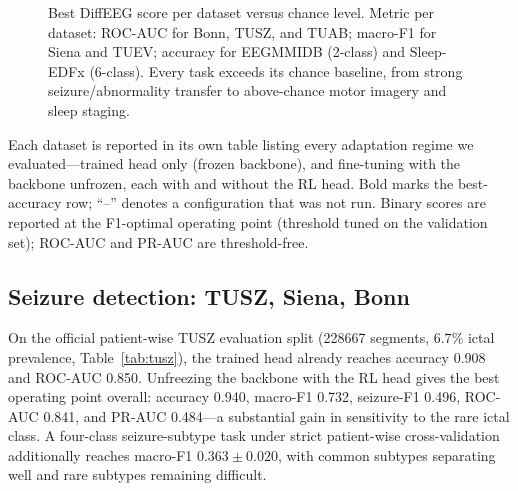\documentclass[journal]{IEEEtran}
\begin{document}
\begin{figure}[t]
\centering
{}
\caption{Best DiffEEG score per dataset versus chance level. Metric per dataset:
ROC-AUC for Bonn, TUSZ, and TUAB; macro-F1 for Siena and TUEV; accuracy for
EEGMMIDB (2-class) and Sleep-EDFx (6-class). Every task exceeds its chance
baseline, from strong seizure/abnormality transfer to above-chance motor imagery
and sleep staging.}
\label{fig:transfer}
\end{figure}

Each dataset is reported in its own table listing every adaptation regime we
evaluated---trained head only (frozen backbone), and fine-tuning with the
backbone unfrozen, each with and without the RL head. Bold marks the
best-accuracy row; ``--'' denotes a configuration that was not run. Binary
scores are reported at the F1-optimal operating point (threshold tuned on the
validation set); ROC-AUC and PR-AUC are threshold-free.

\subsection{Seizure detection: TUSZ, Siena, Bonn}
On the official patient-wise TUSZ evaluation split (\num{228667} segments,
$6.7\%$ ictal prevalence, Table~\ref{tab:tusz}), the trained head already
reaches accuracy \num{0.908} and ROC-AUC \num{0.850}. Unfreezing the backbone
with the RL head gives the best operating point overall: accuracy \num{0.940},
macro-F1 \num{0.732}, seizure-F1 \num{0.496}, ROC-AUC \num{0.841}, and PR-AUC
\num{0.484}---a substantial gain in sensitivity to the rare ictal class. A
four-class seizure-subtype task under strict patient-wise cross-validation
additionally reaches macro-F1 $0.363\pm0.020$, with common subtypes separating
well and rare subtypes remaining difficult.
\end{document}

